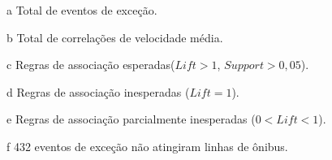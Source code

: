 \documentclass[
	12pt,				%
	oneside,			%
	a4paper,			%
	english,			%
	brazil				%
	]{abntex2ppgsi}
\begin{document}
{{{\begin{apendicesenv}
\begin{table}[!htb]
\begin{threeparttable}
\begin{tablenotes}
            \item[a] Total de eventos de exceção.
            \item[b] Total de correlações de velocidade média.
            \item[c] Regras de associação esperadas($Lift > 1$, $Support > 0,05$).
            \item[d] Regras de associação inesperadas ($Lift = 1$).
            \item[e] Regras de associação parcialmente inesperadas ($0 < Lift < 1$).
            \item[f] 432 eventos de exceção não atingiram linhas de ônibus.
        \end{tablenotes}
\end{threeparttable}
\end{table}


\end{apendicesenv}}}}
\end{document}
